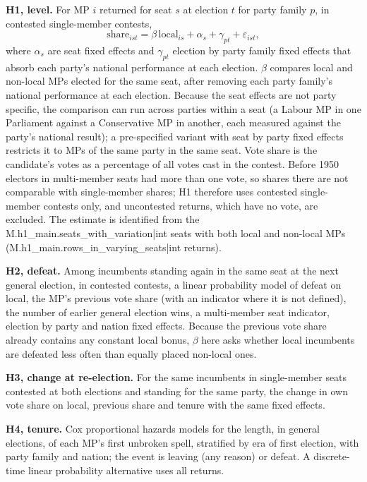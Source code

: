 \documentclass[11pt,a4paper]{article}
\begin{document}
\textbf{H1, level.} For MP $i$ returned for seat $s$ at election $t$ for party family $p$, in contested single-member contests,
\[ \text{share}_{ist} = \beta\, \text{local}_{is} + \alpha_s + \gamma_{pt} + \varepsilon_{ist}, \]
where $\alpha_s$ are seat fixed effects and $\gamma_{pt}$ election by party family fixed effects that absorb each party's national performance at each election. $\beta$ compares local and non-local MPs elected for the same seat, after removing each party family's national performance at each election. Because the seat effects are not party specific, the comparison can run across parties within a seat (a Labour MP in one Parliament against a Conservative MP in another, each measured against the party's national result); a pre-specified variant with seat by party fixed effects restricts it to MPs of the same party in the same seat. Vote share is the candidate's votes as a percentage of all votes cast in the contest. Before 1950 electors in multi-member seats had more than one vote, so shares there are not comparable with single-member shares; H1 therefore uses contested single-member contests only, and uncontested returns, which have no vote, are excluded. The estimate is identified from the {{M.h1_main.seats_with_variation|int}} seats with both local and non-local MPs ({{M.h1_main.rows_in_varying_seats|int}} returns).

\textbf{H2, defeat.} Among incumbents standing again in the same seat at the next general election, in contested contests, a linear probability model of defeat on local, the MP's previous vote share (with an indicator where it is not defined), the number of earlier general election wins, a multi-member seat indicator, election by party and nation fixed effects. Because the previous vote share already contains any constant local bonus, $\beta$ here asks whether local incumbents are defeated less often than equally placed non-local ones.

\textbf{H3, change at re-election.} For the same incumbents in single-member seats contested at both elections and standing for the same party, the change in own vote share on local, previous share and tenure with the same fixed effects.

\textbf{H4, tenure.} Cox proportional hazards models \citep{cox1972} for the length, in general elections, of each MP's first unbroken spell, stratified by era of first election, with party family and nation; the event is leaving (any reason) or defeat. A discrete-time linear probability alternative uses all returns.
\end{document}
